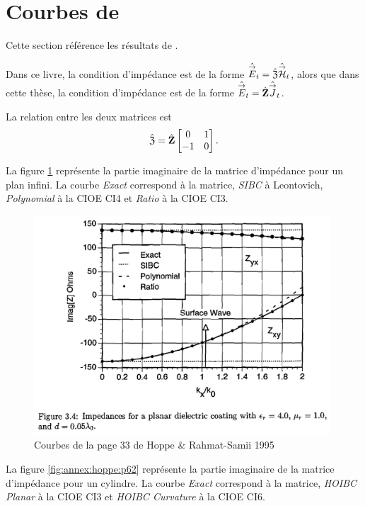 \section[Courbes de HOPPE 1995]{Courbes de \cite{hoppe_impedance_1995}}
\label{sec:annexe:hoppe}
Cette section référence les résultats de \cite{hoppe_impedance_1995}. 


Dans ce livre, la condition d'impédance est de la forme \(\hat{{\overset{\rightarrow}{E}}}_t = \hat{\mathfrak{Z}} \hat{{\overset{\rightarrow}{\mathcal{H}}}}_t\), alors que dans cette thèse, la condition d'impédance est de la forme \(\hat{{\overset{\rightarrow}{E}}}_t = \hat{\mathbf{Z}} \hat{{\overset{\rightarrow}{J}}}_t\). 

La relation entre les deux matrices est
\begin{equation}
  \hat{\mathfrak{Z}} = \hat{\mathbf{Z}}\begin{bmatrix}0&1\\-1&0\end{bmatrix}.
\end{equation}

La figure \ref{fig:annex:hoppe:p33} représente la partie imaginaire de la matrice d'impédance pour un plan infini. La courbe \textit{Exact} correspond à la matrice, \textit{SIBC} à Leontovich, \textit{Polynomial} à la CIOE CI4 et \textit{Ratio} à la CIOE CI3.

\begin{figure}[h!tb]
    \includegraphics[width=0.99\textwidth]{images/hoppe/p33_imp_cylindre.png}
    \caption{Courbes de la page 33 de Hoppe \& Rahmat-Samii 1995}
    \label{fig:annex:hoppe:p33}
\end{figure}

La figure \ref{fig:annex:hoppe:p62} représente la partie imaginaire de la matrice d'impédance  pour un cylindre. La courbe \textit{Exact} correspond à la matrice, \textit{HOIBC Planar} à la CIOE CI3 et \textit{HOIBC Curvature} à la CIOE CI6.

